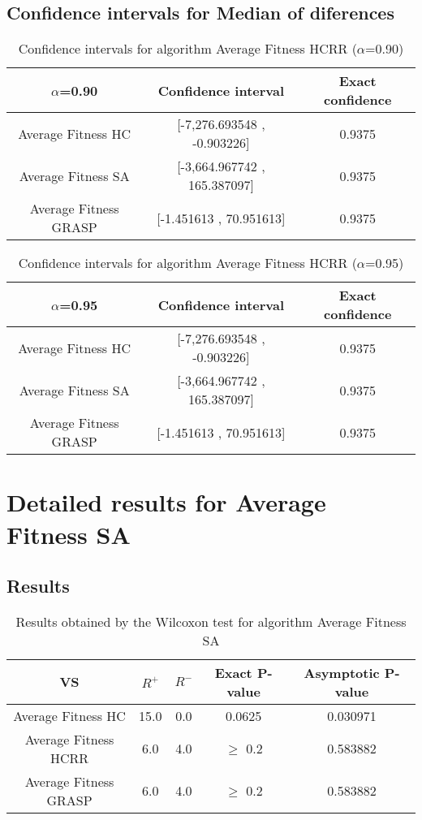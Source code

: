 \documentclass[a4paper,10pt]{article}
\begin{document}
\subsection{Confidence intervals for Median of diferences}

\begin{table}[!htp]
\centering\small
\begin{tabular}{
|c|c|c|}
\hline
 $\alpha$=0.90 & Confidence interval & Exact confidence \\ \hline 
Average Fitness HC & [-7,276.693548 , -0.903226] & 0.9375\\ \hline 
Average Fitness SA & [-3,664.967742 , 165.387097] & 0.9375\\ \hline 
Average Fitness GRASP & [-1.451613 , 70.951613] & 0.9375\\ \hline 

\end{tabular}
\caption{Confidence intervals for algorithm Average Fitness HCRR ($\alpha$=0.90)}
\end{table}
\begin{table}[!htp]
\centering\small
\begin{tabular}{
|c|c|c|}
\hline
 $\alpha$=0.95 & Confidence interval & Exact confidence \\ \hline 
Average Fitness HC & [-7,276.693548 , -0.903226] & 0.9375\\ \hline 
Average Fitness SA & [-3,664.967742 , 165.387097] & 0.9375\\ \hline 
Average Fitness GRASP & [-1.451613 , 70.951613] & 0.9375\\ \hline 

\end{tabular}
\caption{Confidence intervals for algorithm Average Fitness HCRR ($\alpha$=0.95)}
\end{table}

 \clearpage 


\section{Detailed results for Average Fitness SA}


\subsection{Results}

\begin{table}[!htp]
\centering\small
\begin{tabular}{
|c|c|c|c|c|}
\hline
 VS & $R^{+}$ & $R^{-}$ & Exact P-value & Asymptotic P-value \\ \hline 
Average Fitness HC & 15.0 & 0.0 & 0.0625 & 0.030971\\ \hline 
Average Fitness HCRR & 6.0 & 4.0 & $\geq$ 0.2 & 0.583882\\ \hline 
Average Fitness GRASP & 6.0 & 4.0 & $\geq$ 0.2 & 0.583882\\ \hline 

\end{tabular}
\caption{Results obtained by the Wilcoxon test for algorithm Average Fitness SA}
\end{table}
\end{document}
